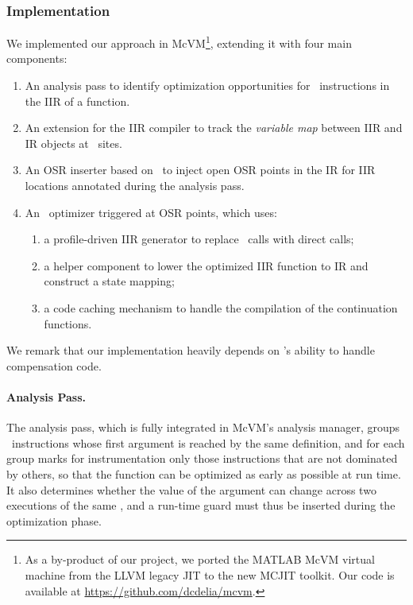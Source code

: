 \subsubsection*{Implementation}

We implemented our approach in McVM\footnote{As a by-product of our project, we ported the MATLAB McVM virtual machine from the LLVM legacy JIT to the new MCJIT toolkit. Our code is available at \url{https://github.com/dcdelia/mcvm}.}, extending it with four main components:

\begin{enumerate}[itemsep=0pt,parsep=3pt]
\item An analysis pass to identify optimization opportunities for \feval\ instructions in the IIR of a function.
\item An extension for the IIR compiler to track the {\em variable map} between IIR and IR objects at \feval\ sites.
\item An OSR inserter based on \osrkit\ to inject open OSR points in the IR for IIR locations annotated during the analysis pass.
\item An \feval\ optimizer triggered at OSR points, which uses:
  \begin{enumerate}[itemsep=0pt,partopsep=0pt]
  \item a profile-driven IIR generator to replace \feval\ calls with direct calls;
  \item a helper component to lower the optimized IIR function to IR and construct a state mapping;
  \item a code caching mechanism to handle the compilation of the continuation functions.
  \end{enumerate}
\end{enumerate}

\noindent We remark that our implementation heavily depends on \osrkit's ability to handle compensation code. 

\paragraph*{Analysis Pass.} The analysis pass, which is fully integrated in McVM's analysis manager, groups \feval\ instructions whose first argument is reached by the same definition, and for each group marks for instrumentation only those instructions that are not dominated by others, so that the function can be optimized as early as possible at run time.
It also determines whether the value of the argument can change across two executions of the same \feval, and a run-time guard must thus be inserted during the optimization phase.

